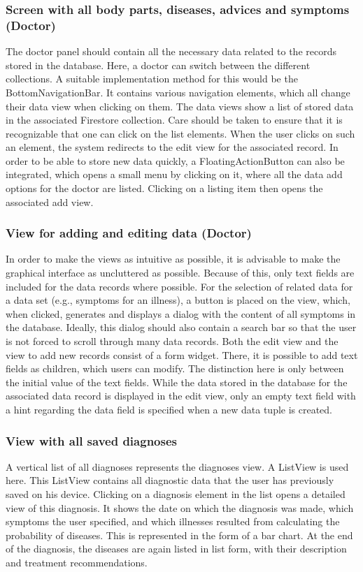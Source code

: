\subsubsection{\textbf{Screen with all body parts, diseases, advices and symptoms (Doctor)}}
The doctor panel should contain all the necessary data related to the records stored in the database. Here, a doctor can switch between the different collections. A suitable implementation method for this would be the BottomNavigationBar. It contains various navigation elements, which all change their data view when clicking on them. The data views show a list of stored data in the associated Firestore collection. Care should be taken to ensure that it is recognizable that one can click on the list elements. When the user clicks on such an element, the system redirects to the edit view for the associated record. In order to be able to store new data quickly, a FloatingActionButton can also be integrated, which opens a small menu by clicking on it, where all the data add options for the doctor are listed. Clicking on a listing item then opens the associated add view.

\subsubsection{\textbf{View for adding and editing data (Doctor)}}
In order to make the views as intuitive as possible, it is advisable to make the graphical interface as uncluttered as possible. Because of this, only text fields are included for the data records where possible. For the selection of related data for a data set (e.g., symptoms for an illness), a button is placed on the view, which, when clicked, generates and displays a dialog with the content of all symptoms in the database. Ideally, this dialog should also contain a search bar so that the user is not forced to scroll through many data records. Both the edit view and the view to add new records consist of a form widget. There, it is possible to add text fields as children, which users can modify. The distinction here is only between the initial value of the text fields. While the data stored in the database for the associated data record is displayed in the edit view, only an empty text field with a hint regarding the data field is specified when a new data tuple is created.

\subsubsection{\textbf{View with all saved diagnoses}}
A vertical list of all diagnoses represents the diagnoses view. A ListView is used here. This ListView contains all diagnostic data that the user has previously saved on his device. Clicking on a diagnosis element in the list opens a detailed view of this diagnosis. It shows the date on which the diagnosis was made, which symptoms the user specified, and which illnesses resulted from calculating the probability of diseases. This is represented in the form of a bar chart. At the end of the diagnosis, the diseases are again listed in list form, with their description and treatment recommendations.

